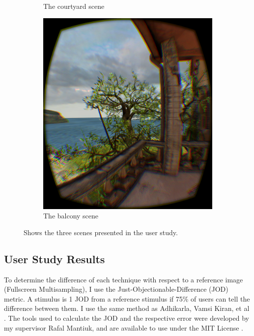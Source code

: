 \documentclass[12pt,a4paper,twoside,openright]{report}
\begin{document}
\begin{figure}[tbh]
\begin{centering}
\begin{subfigure}{0.3\textwidth}
\caption{The courtyard scene}
\end{subfigure}
\begin{subfigure}{0.3\textwidth}
\includegraphics[width=0.9\linewidth]{figs/tree_msaa.png}
\caption{The balcony scene}
\end{subfigure}
\caption{Shows the three scenes presented in the user study.}
\end{centering}
\end{figure}

\clearpage

\subsection{User Study Results}\label{studyResults}

To determine the difference of each technique with respect to a reference image (Fullscreen Multisampling), I use the Just-Objectionable-Difference (JOD) metric. A stimulus is 1 JOD from a reference stimulus if 75\% of users can tell the difference between them. I use the same method as Adhikarla, Vamsi Kiran, et al \cite{rafalPaper}. The tools used to calculate the JOD and the respective error were developed by my supervisor Rafal Mantiuk, and are available to use under the MIT License \cite{pwcomp}. 
\end{document}
